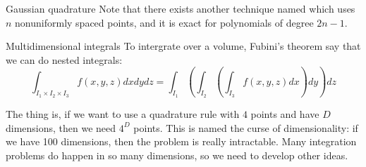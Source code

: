 \documentclass[a4paper]{article}
\begin{document}
\begin{parag}{Gaussian quadrature}
    Note that there exists another technique named  which uses $n$ nonuniformly spaced points, and it is exact for polynomials of degree $2n - 1$.
\end{parag}


\begin{parag}{Multidimensional integrals}
    To intergrate over a volume, Fubini's theorem say that we can do nested integrals: 
    \[\int_{I_1 \times I_2 \times I_3} f\left(x, y, z\right)dxdydz = \int_{I_1} \left(\int_{I_2} \left(\int_{I_3} f\left(x, y, z\right) dx\right) dy\right) dz\]
    
    The thing is, if we want to use a quadrature rule with $4$ points and have $D$ dimensions, then we need $4^D$ points. This is named the curse of dimensionality: if we have 100 dimensions, then the problem is really intractable. Many integration problems do happen in so many dimensions, so we need to develop other ideas.
\end{parag}
\end{document}
